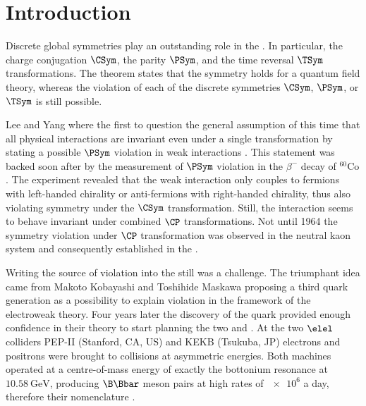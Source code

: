 
\chapter{Introduction}
\label{ch:introduction}



Discrete global symmetries play an outstanding role in the \SM. In particular,
the charge conjugation $\CSym$, the parity $\PSym$, and the time reversal
$\TSym$ transformations. The \CPT theorem \cite{set:cpt} states that the \CPT
symmetry holds for a quantum field theory, whereas the violation of each of
the discrete symmetries $\CSym$, $\PSym$, or $\TSym$ is still possible.

Lee and Yang where the first to question the general assumption of this time that all
physical interactions are invariant even under a single transformation by
stating a possible $\PSym$ violation in weak interactions \cite{Lee:1956qn}. This
statement was backed soon after by the measurement of $\PSym$ violation in the
$\beta^{-}$ decay of ${}^{60}\text{Co}$ \cite{Wu:1957my}. The experiment
revealed that the weak interaction only couples to fermions with left-handed
chirality or anti-fermions with right-handed chirality, thus also violating
symmetry under the $\CSym$ transformation. Still, the interaction seems to behave
invariant under combined $\CP$ transformations. Not until 1964 the symmetry
violation under $\CP$ transformation was observed in the neutral kaon system
\cite{Christenson:1964fg} and consequently established in the \SM.

Writing the source of \CP violation into the \SM still was a challenge. The
triumphant idea came from Makoto Kobayashi and Toshihide Maskawa
\cite{Kobayashi:1973fv} proposing a third quark generation as a possibility to
explain \CP violation in the framework of the electroweak theory. Four years
later the discovery of the \bquark quark \cite{Herb:1977ek} provided enough
confidence in their theory to start planning the two \BFactories \Babar and
\Belle. At the two $\elel$ colliders PEP-II (Stanford, CA, US) and KEKB
(Tsukuba, JP) electrons and positrons were brought to collisions at asymmetric
energies. Both machines operated at a centre-of-mass energy of exactly the
\YFourS bottonium resonance at $\SI{10.58}{\GeV}$, producing $\B\Bbar$ meson
pairs at high rates of $\num{e6}$ a day, therefore their nomenclature
\cite{Bevan:2014iga}.

